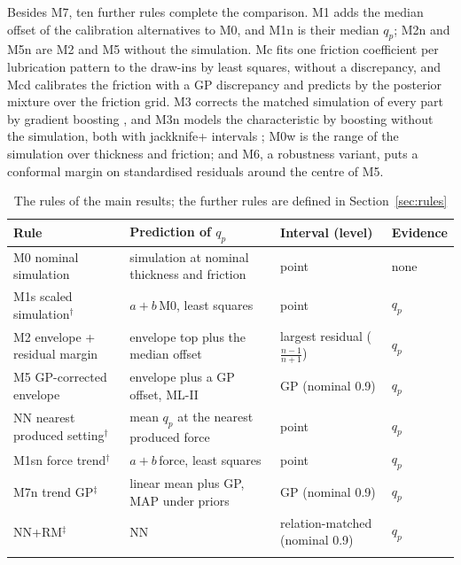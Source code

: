 \documentclass[pdflatex,sn-basic,lineno]{sn-jnl}
\newcommand{\tabsize}{\fontsize{8}{9.5}\selectfont}
\begin{document}
Besides M7, ten further rules complete the comparison. M1 adds the median offset of the calibration alternatives to M0, and M1n is their median $q_p$; M2n and M5n are M2 and M5 without the simulation. Mc fits one friction coefficient per lubrication pattern to the draw-ins by least squares, without a discrepancy, and Mcd calibrates the friction with a GP discrepancy \citep{kennedy2001bayesian} and predicts by the posterior mixture over the friction grid. M3 corrects the matched simulation of every part by gradient boosting \citep{friedman2001greedy}, and M3n models the characteristic by boosting without the simulation, both with jackknife+ intervals \citep{barber2021predictive}; M0w is the range of the simulation over thickness and friction; and M6, a robustness variant, puts a conformal margin on standardised residuals around the centre of M5.

\begin{table}[t]
\tabsize
\setlength{\tabcolsep}{3.5pt}
\caption{The rules of the main results; the further rules are defined in Section~\ref{sec:rules}}\label{tab:rules}
\begin{tabular}{@{}L{3.6cm}L{4.6cm}L{2.3cm}L{1.4cm}@{}}
\toprule
Rule & Prediction of $q_p$ & Interval (level) & Evidence \\
\midrule
M0 nominal simulation & simulation at nominal thickness and friction & point & none \\
M1s scaled simulation$^\dagger$ & $a+b\,$M0, least squares & point & $q_p$ \\
M2 envelope + residual margin & envelope top plus the median offset & largest residual ($\frac{n-1}{n+1}$) & $q_p$ \\
M5 GP-corrected envelope & envelope plus a GP offset, ML-II & GP (nominal 0.9) & $q_p$ \\
NN nearest produced setting$^\dagger$ & mean $q_p$ at the nearest produced force & point & $q_p$ \\
M1sn force trend$^\dagger$ & $a+b\,$force, least squares & point & $q_p$ \\
M7n trend GP$^\ddagger$ & linear mean plus GP, MAP under priors & GP (nominal 0.9) & $q_p$ \\
NN+RM$^\ddagger$ & NN & relation-matched (nominal 0.9) & $q_p$ \\
\botrule
\end{tabular}
\end{table}
\end{document}
